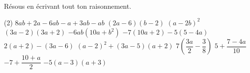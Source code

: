 %
%
    Résous en écrivant tout ton raisonnement.
    \begin{tasks}(2)
        \task $8ab+2a-6ab-a+3ab-ab$%
        \task $(2a-6)(b-2)$
        \task $ (a-2b)^2$
        \task $(3a-2)(3a+2)$
        \task $-6ab(10a+b^2)$%
        \task $-7(10a+2)-5(5-4a)$%
        \task $2(a+2) - (3a-6)$
        \task $(a-2)^2+(3a-5)(a+2)$
        \task $ 7\left(\dfrac{3a}{2}-\dfrac{3}{8}\right)$%
        \task $5+\dfrac{7-4 a}{10}$%
        \task $-7+\dfrac{10+a}{2}$ %
        \task $-5(a-3)(a+3)$
    \end{tasks}
